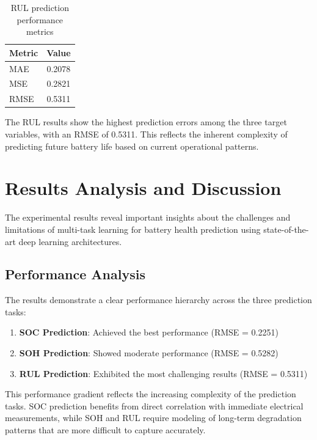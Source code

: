 \begin{table}[htbp]
\centering
\caption{RUL prediction performance metrics}
\label{tab:rul_results}
\begin{tabular}{lc}
\hline
\textbf{Metric} & \textbf{Value} \\
\hline
MAE & 0.2078 \\
MSE & 0.2821 \\
RMSE & 0.5311 \\
\hline
\end{tabular}
\end{table}

The RUL results show the highest prediction errors among the three target variables, with an RMSE of 0.5311. This reflects the inherent complexity of predicting future battery life based on current operational patterns.

\section{Results Analysis and Discussion}
\label{sec:results_discussion}

The experimental results reveal important insights about the challenges and limitations of multi-task learning for battery health prediction using state-of-the-art deep learning architectures.

\subsection{Performance Analysis}
\label{subsec:performance_analysis}

The results demonstrate a clear performance hierarchy across the three prediction tasks:

\begin{enumerate}
    \item \textbf{SOC Prediction}: Achieved the best performance (RMSE = 0.2251)
    \item \textbf{SOH Prediction}: Showed moderate performance (RMSE = 0.5282)
    \item \textbf{RUL Prediction}: Exhibited the most challenging results (RMSE = 0.5311)
\end{enumerate}

This performance gradient reflects the increasing complexity of the prediction tasks. SOC prediction benefits from direct correlation with immediate electrical measurements, while SOH and RUL require modeling of long-term degradation patterns that are more difficult to capture accurately.

